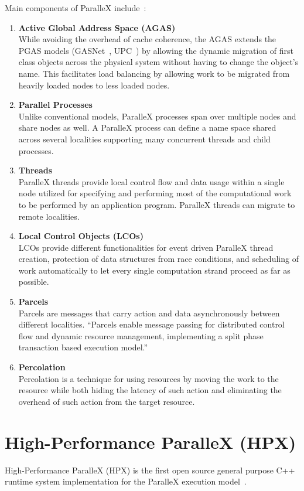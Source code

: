 Main components of ParalleX include~\cite{gao2007parallex,kaiser2009parallex,dekate2012improving}:
\begin{enumerate}
\item \textbf{Active Global Address Space (AGAS)}\\
  While avoiding the overhead of cache coherence, the AGAS extends the PGAS \cite{stitt2009introduction} models (GASNet~\cite{bonachea2002gasnet}, UPC~\cite{upc2005upc}) by allowing the dynamic migration of first class objects across the physical system without having to change the object's name. This facilitates load balancing by allowing work to be migrated from heavily loaded nodes to less loaded nodes.  
\item \textbf{Parallel Processes}\\
  Unlike conventional models, ParalleX processes span over multiple nodes and share nodes as well. A ParalleX process can define a name space shared across several localities supporting many concurrent threads and child processes.
\item \textbf{Threads}\\
  ParalleX threads provide local control flow and data usage within a single node utilized for specifying and performing most of the computational work to be performed by an application program. ParalleX threads can migrate to remote localities. 
\item \textbf{Local Control Objects (LCOs)}\\
  LCOs provide different functionalities for event driven ParalleX thread creation, protection of data structures from race conditions, and scheduling of work automatically to let every single computation strand proceed as far as possible.
\item \textbf{Parcels}\\
  Parcels are messages that carry action and data asynchronously between different localities. ``Parcels enable message passing for distributed control flow and dynamic resource management, implementing a split phase transaction based execution model.''~\cite{kaiser2009parallex}
\item \textbf{Percolation}\\
  Percolation is a technique for using resources by moving the work to the resource while both hiding the latency of such action and eliminating the overhead of such action from the target resource. 
\end{enumerate}


\section{High-Performance ParalleX (HPX)}
\label{sec:hpx}
High-Performance ParalleX (HPX) is the first open source general purpose C++ runtime system implementation for the ParalleX execution model~\cite{huck2013early,kaiser2014hpx}.

